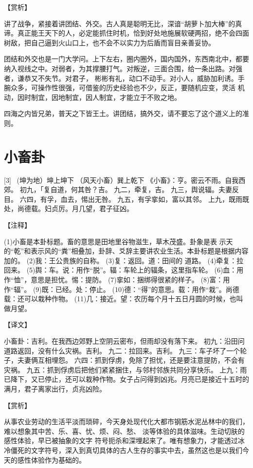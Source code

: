 \documentclass[12pt,UTF8]{ctexbook}
\begin{document}
【赏析】

讲了战争，紧接着讲团结、外交。古人真是聪明无比，深谙“胡萝卜加大棒”的真谛。真正能王天下的人，必定能抓住时机，恰到好处地施展软硬两招，绝不会四面树敌，把自己逼到火山口上，也不会不以实力为后盾而盲目亲善妥协。

团结和外交也是一门大学问。上下左右，圈内圈外，国内国外，东西南北中，都要纳入视线之中。对弱者，为其撑腰打气。对叛逆，三面合围，给一条出路。对强者，谦恭又不失节。对君子， 彬彬有礼，动口不动手。对小人，威胁加利诱。手腕众多，可操作性很强，可借鉴的历史经验也不少，反正，要随机应变，灵活 机动，因时制宜，因地制宜，因人制宜，才能立于不败之地。

四海之内皆兄弟，普天之下皆王土。讲团结，搞外交，请不要忘了这个道义上的准则。

\chapter{小畜卦}
[3] \ (坤为地）坤上坤下
（风天小畜）巽上乾下
《小畜》：亨。密云不雨。自我西郊。
初九，「复自道，何其咎？吉。
九二，牵复，吉。
九三，舆说辐。夫妻反目。
六四，有孚，血去，惕出无咎。
九五，有孚挛如，富以其邻。
上九，既雨既处，尚德载。妇贞厉。月几望，君子征凶。

【注释】

(1)小畜是本卦标题。畜的意思是田地里谷物滋生，草木茂盛。卦象是表 示天的“乾”和表示风的“粪”相叠加，卦辞、爻辞主要讲农业生活。本卦标题是根据内容加的。
(2)我：王公贵族的自称。
(3)复：返回。道：田间的 道路。
(4)牵复：拉回来。
(5)舆：车。说：用作“脱”。辐：车轮上的辐条，这里指车轮。
(6)血：用作“恤”，意思是担忧。惕：提防。
(7)挛如：捆绑得很紧的样子。
(8)富：用作“辐”。
(9)既：已经。处：停止。
(10)德：“得”的意思。载：用作“栽”。尚德载：还可以栽种作物。
(11)几：接近。望：农历每个月十五日月圆的时候，也叫做月望。

【译文】

小畜卦：吉利。在我西边郊野上空阴云密布，但雨却没有落下来。
初九：沿田问道路返回，没有什么灾祸。吉利。
九二：拉回来。吉利。
九三：车子坏了一个轮子，夫妻俩互相埋怨。
六四：抓到俘虏，免除了担忧，还是要注意提防，不会有灾祸。
九五：抓到俘虏后把他们紧紧捆住，与邻村邻族共同分享快乐。
上九：雨已降下，又已停止，还可以栽种作物。女子占问得到凶兆。月亮已是接近十五时的满月，君子离家出行，贞兆凶险。

【赏析】

从事农业劳动的生活平淡而琐碎，今天身处现代化大都市钢筋水泥丛林中的我们，难以想象其中苦、乐、喜、忧、烦、闷、愁、 淡等体验的具体滋味。生动切肤的感性体验，早已被抽象的文字 符号扼杀和深埋起来了。唯有想象力，才能透过冰冷僵死的文字符号，深入到真切具体的古人生存的事实中去，虽然这也是以我们今天的感性体验作为基础的。
\end{document}
